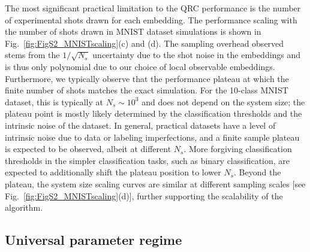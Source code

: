 \documentclass[english,floatfix,twocolumn,showpacs, aps, prx, reprint, superscriptaddress, longbibliography]{revtex4-2}
\begin{document}
The most significant practical limitation to the QRC performance is the number of experimental shots drawn for each embedding. The performance scaling with the number of shots drawn in MNIST dataset simulations is shown in Fig.~\ref{fig:FigS2_MNISTscaling}(c) and (d). The sampling overhead observed stems from the $1/\sqrt{N_s}$ uncertainty due to the shot noise in the embeddings and is thus only polynomial due to our choice of local observable embeddings. Furthermore, we typically observe that the performance plateau at which the finite number of shots matches the exact simulation. For the 10-class MNIST dataset, this is typically at $N_s \sim 10^3$ and does not depend on the system size; the plateau point is mostly likely determined by the classification thresholds and the intrinsic noise of the dataset. In general, practical datasets have a level of intrinsic noise due to data or labeling imperfections, and a finite sample plateau is expected to be observed, albeit at different $N_s$. More forgiving classification thresholds in the simpler classification tasks, such as binary classification, are expected to additionally shift the plateau position to lower $N_s$. Beyond the plateau, the system size scaling curves are similar at different sampling scales [see Fig.~\ref{fig:FigS2_MNISTscaling}(d)], further supporting the scalability of the algorithm.   

\subsection{Universal parameter regime}
\label{sec:parameters}
\end{document}
